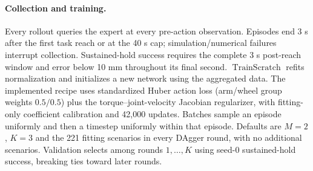 \documentclass[10pt]{article}
\newcommand{\Train}{\operatorname{TrainScratch}}
\begin{document}
\paragraph{Collection and training.}
Every rollout queries the expert at every pre-action observation. Episodes end
3 s after the first task reach or at the 40 s cap; simulation/numerical failures
interrupt collection. Sustained-hold success requires the complete 3 s
post-reach window and error below 10 mm throughout its final second.
$\Train$ refits normalization and initializes a new network using the aggregated
data. The implemented recipe uses standardized Huber action loss (arm/wheel group
weights $0.5/0.5$) plus the torque--joint-velocity Jacobian regularizer,
with fitting-only coefficient calibration and 42,000 updates. Batches sample
an episode uniformly and then a timestep uniformly within that episode.
Defaults are $M=2$, $K=3$ and the 221 fitting scenarios in every DAgger round,
with no additional scenarios. Validation selects among rounds
$1,\ldots,K$ using seed-0 sustained-hold success, breaking ties toward later rounds.
\end{document}
